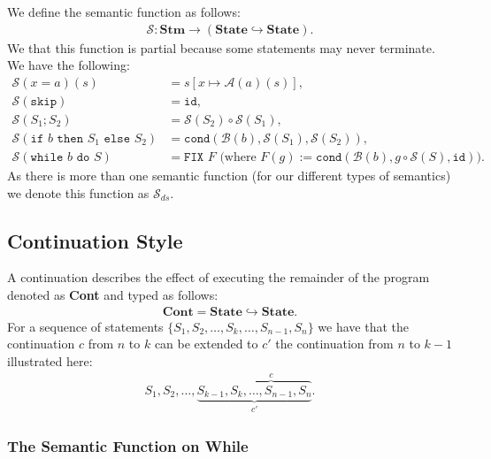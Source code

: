 We define the semantic function as follows: \begin{gather*}
  \mathcal{S}: \textbf{Stm} \to (\textbf{State} \hookrightarrow \textbf{State}).
\end{gather*} We that this function is partial because some statements
may never terminate. We have the following: \begin{align*}
  \mathcal{S}(x = a)(s) &= s[x \mapsto \mathcal{A}(a)(s)], \\
  \mathcal{S}(\texttt{skip}) &= \texttt{id}, \\
  \mathcal{S}(S_1 ; S_2) &= \mathcal{S}(S_2) \circ \mathcal{S}(S_1), \\
  \mathcal{S}(\texttt{if } b \texttt{ then } S_1 \texttt{ else } S_2)
  &= \texttt{cond}(\mathcal{B}(b), \mathcal{S}(S_1), \mathcal{S}(S_2)), \\
  \mathcal{S}(\texttt{while } b \texttt{ do } S)
  &= \texttt{FIX } F \text{ (where } F(g) 
  := \texttt{cond}(\mathcal{B}(b), g \circ \mathcal{S}(S), \texttt{id})).
\end{align*} 
As there is more than one semantic function (for our different types
of semantics) we denote this function as $\mathcal{S}_{ds}$.

\subsection{Continuation Style}

A continuation describes the effect of executing the remainder of the
program denoted as \textbf{Cont} and typed as follows: \begin{gather*}
  \textbf{Cont} = \textbf{State} \hookrightarrow \textbf{State}.
\end{gather*} For a sequence of statements
$\{S_1, S_2, \ldots, S_k, \ldots, S_{n - 1}, S_n\}$
we have that the continuation $c$ from $n$ to $k$ can be extended
to $c'$ the continuation from $n$ to $k - 1$ illustrated here: \begin{gather*}
  S_1, S_2, \ldots, 
  \underbrace{S_{k - 1}, \overbrace{S_k, \ldots, S_{n - 1}, S_n}^c}_{c'}.
\end{gather*}

\newpage

\subsubsection{The Semantic Function on \textbf{While}} 

